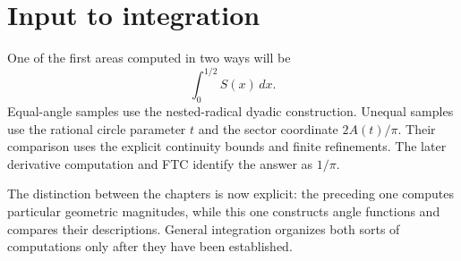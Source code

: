 \section{Input to integration}
One of the first areas computed in two ways will be
\[
 \int_0^{1/2}S(x)\,dx.
\]
Equal-angle samples use the nested-radical dyadic construction.  Unequal
samples use the rational circle parameter $t$ and the sector coordinate
$2A(t)/\pi$.  Their comparison uses the explicit continuity bounds and
finite refinements.  The later derivative computation and FTC identify
the answer as $1/\pi$.

The distinction between the chapters is now explicit: the preceding one
computes particular geometric magnitudes, while this one constructs angle
functions and compares their descriptions.  General integration organizes
both sorts of computations only after they have been established.
